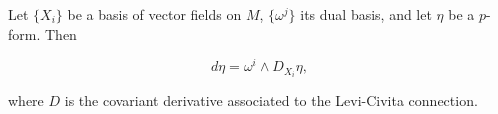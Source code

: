 Let $\{X_i\}$ be a basis of vector fields on $M$, $\{\omega^j\}$ its dual basis, and let $\eta$ be a $p$-form. Then

$$d\eta = \omega^i \wedge D_{X_i} \eta,$$

where $D$ is the covariant derivative associated to the Levi-Civita connection.
